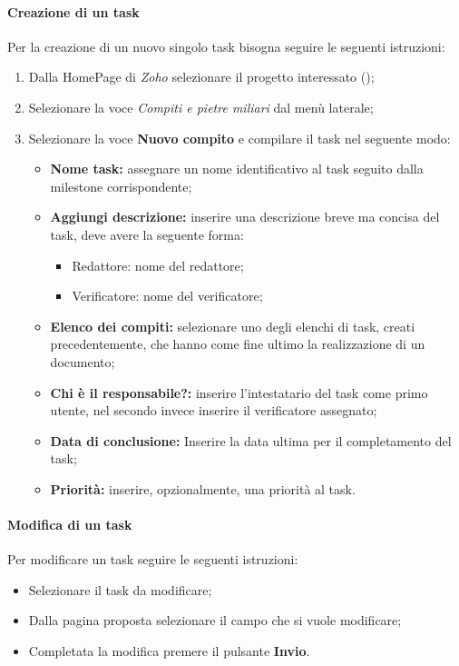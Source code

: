 \paragraph{Creazione di un task}
Per la creazione di un nuovo singolo task bisogna seguire le seguenti 
istruzioni:
\begin{enumerate}
  \item Dalla HomePage di \textit{Zoho} selezionare il progetto interessato (\progetto);
  \item Selezionare la voce \textsl{Compiti e pietre miliari} dal menù laterale;
  \item Selezionare la voce \textbf{Nuovo compito} e compilare il task nel 
  seguente modo:
    \begin{itemize}
      \item \textbf{Nome task:} assegnare un nome identificativo al task seguito dalla milestone corrispondente;
      \item \textbf{Aggiungi descrizione:} inserire una descrizione breve ma 
      concisa del task, deve avere la seguente forma:
        \begin{itemize}
          \item Redattore: nome del redattore;
          \item Verificatore: nome del verificatore;
        \end{itemize}
      \item \textbf{Elenco dei compiti:} selezionare uno degli elenchi di 
      task, creati precedentemente, che hanno come fine ultimo la realizzazione di un 
      documento;
      \item \textbf{Chi è il responsabile?:} inserire l'intestatario del task 
      come primo utente, nel secondo invece inserire il verificatore assegnato;
      \item \textbf{Data di conclusione:} Inserire la data ultima per il 
      completamento del task;
     \item \textbf{Priorità:} inserire, opzionalmente, una priorità al task.
    \end{itemize}
\end{enumerate}


\paragraph{Modifica di un task}
Per modificare un task seguire le seguenti istruzioni:
\begin{itemize}
  \item Selezionare il task da modificare;
  \item Dalla pagina proposta selezionare il campo che si vuole modificare;
  \item Completata la modifica premere il pulsante \textbf{Invio}.
\end{itemize}

